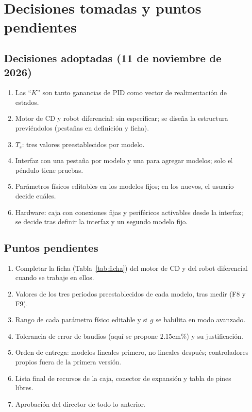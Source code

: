 \documentclass[12pt,letterpaper]{article}
\begin{document}
\section{Decisiones tomadas y puntos pendientes}
\label{sec:preguntas}

\subsection{Decisiones adoptadas (11 de noviembre de 2026)}
\begin{enumerate}
    \item Las ``$K$'' son tanto ganancias de PID como vector de realimentación de estados.
    \item Motor de CD y robot diferencial: sin especificar; se diseña la estructura previéndolos (pestañas en definición y ficha).
    \item $T_s$: tres valores preestablecidos por modelo.
    \item Interfaz con una pestaña por modelo y una para agregar modelos; solo el péndulo tiene pruebas.
    \item Parámetros físicos editables en los modelos fijos; en los nuevos, el usuario decide cuáles.
    \item Hardware: caja con conexiones fijas y periféricos activables desde la interfaz; se decide tras definir la interfaz y un segundo modelo fijo.
\end{enumerate}

\subsection{Puntos pendientes}
\begin{enumerate}
    \item Completar la ficha (Tabla~\ref{tab:ficha}) del motor de CD y del robot diferencial cuando se trabaje en ellos.
    \item Valores de los tres periodos preestablecidos de cada modelo, tras medir (F8 y F9).
    \item Rango de cada parámetro físico editable y si $g$ se habilita en modo avanzado.
    \item Tolerancia de error de baudios (aquí se propone 2\kern.15em\relax\%) y su justificación.
    \item Orden de entrega: modelos lineales primero, no lineales después; controladores propios fuera de la primera versión.
    \item Lista final de recursos de la caja, conector de expansión y tabla de pines libres.
    \item Aprobación del director de todo lo anterior.
\end{enumerate}
\end{document}
